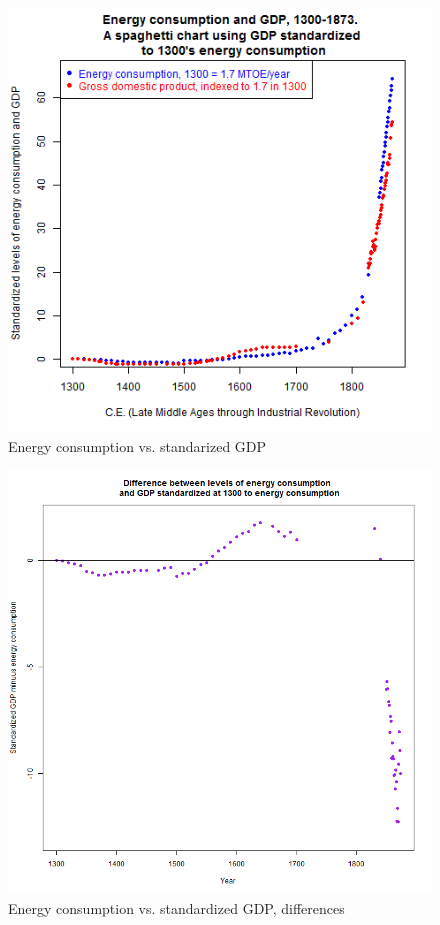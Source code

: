 \documentclass[final]{beamer}
\begin{document}
\begin{frame}
\begin{figure}[p!]
\center
\caption{Energy consumption vs. standarized GDP}
\label{fig:energyVsGdp}
\includegraphics[height=0.8\textheight]{energyVsGdp}
\end{figure}
\end{frame}

\begin{frame}
\begin{figure}[p!]
\center
\caption{Energy consumption vs. standardized GDP, differences}
\label{fig:energyVsGdpDiff}
\includegraphics[height=0.8\textheight]{energyVsGdpDiff}
\end{figure}
\end{frame}
\end{document}
